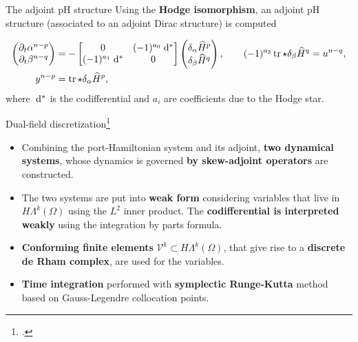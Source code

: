 \documentclass[aspectratio=169]{beamer}
\DeclareMathOperator{\tr}{tr}
\newcommand*{\dual}[1]{\ensuremath{\widehat{#1}}}
\begin{document}
\begin{frame}{The adjoint pH structure}
	Using the \textbf{Hodge isomorphism}, an adjoint pH structure (associated to an adjoint Dirac structure) is computed
	
	\begin{tcolorbox}[nobeforeafter, colframe=theme,title=Adjoint pH system]%
	\begin{equation*}
		\begin{aligned}
			\begin{pmatrix}
				\partial_t {\alpha}^{n-p} \\
				\partial_t {\beta}^{n-q} \\
			\end{pmatrix} &= -
			\begin{bmatrix}
				0 &  (-1)^{a_0}\d{}^* \\
				(-1)^{a_1}\d{}^* & 0 \\
			\end{bmatrix}
			\begin{pmatrix}
				\delta_{\alpha} \dual{H}^p \\
				\delta_{{\beta}} \dual{H}^q
			\end{pmatrix}, \qquad (-1)^{a_3}\tr \star \delta_{{\beta}} \dual{H}^q= u^{n-q}, \\
			y^{n-p} &= \tr \star \delta_{\alpha} \dual{H}^p,
		\end{aligned}
	\end{equation*}
	where $\d{}^{*}$ is the codifferential and $a_i$ are coefficients due to the Hodge star.
	\end{tcolorbox} 

\end{frame}
	
\begin{frame}{Dual-field discretization\footcite{brugnoli2022df}}
	\begin{itemize}
		\item Combining the port-Hamiltonian system and its adjoint, \textbf{two dynamical systems}, whose dynamics is governed \textbf{by skew-adjoint operators} are constructed.
		\item The two systems are put into \textbf{weak form} considering variables that live in $H\Lambda^k(\Omega)$ using the $L^2$ inner product. The \textbf{codifferential is interpreted weakly} using the integration by parts formula.
		\item \textbf{Conforming finite elements} $\mathcal{V}^k \subset H\Lambda^k(\Omega)$, that give rise to a \textbf{discrete de Rham complex}, are used for the variables.
		\item \textbf{Time integration} performed with \textbf{symplectic Runge-Kutta} method based on Gauss-Legendre collocation points.
	\end{itemize}
	
\end{frame}
\end{document}
